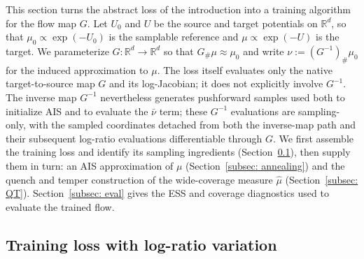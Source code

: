 \documentclass{article}
\begin{document}
This section turns the abstract loss of the introduction into a training algorithm for the flow map $G$. Let $U_0$ and $U$ be the source and target potentials on $\mathbb R^d$, so that $\mu_0 \propto \exp(-U_0)$ is the samplable reference and $\mu \propto \exp(-U)$ is the target. We parameterize $G:\mathbb R^d\to\mathbb R^d$ so that $G_{\#}\mu \approx \mu_0$ and write $\nu := (G^{-1})_{\#}\mu_0$ for the induced approximation to $\mu$. The loss itself evaluates only the native target-to-source map $G$ and its log-Jacobian; it does not explicitly involve $G^{-1}$. The inverse map $G^{-1}$ nevertheless generates pushforward samples used both to initialize AIS and to evaluate the $\bar\nu$ term; these $G^{-1}$ evaluations are sampling-only, with the sampled coordinates detached from both the inverse-map path and their subsequent log-ratio evaluations differentiable through $G$. We first assemble the training loss and identify its sampling ingredients (Section~\ref{subsec: total-loss}), then supply them in turn: an AIS approximation of $\mu$ (Section~\ref{subsec: annealing}) and the quench and temper construction of the wide-coverage measure $\hat\mu$ (Section~\ref{subsec: QT}). Section~\ref{subsec: eval} gives the ESS and coverage diagnostics used to evaluate the trained flow.

\subsection{Training loss with log-ratio variation}
\label{subsec: total-loss}
\end{document}
